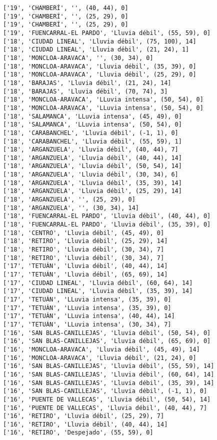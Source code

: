 \documentclass[11pt]{article}
\begin{document}
\begin{Verbatim}[commandchars=\\\{\}]
['19', 'CHAMBERÍ', '', (40, 44), 0]
['19', 'CHAMBERÍ', '', (25, 29), 0]
['19', 'CHAMBERÍ', '', (25, 29), 0]
['19', 'FUENCARRAL-EL PARDO', 'Lluvia débil', (55, 59), 0]
['18', 'CIUDAD LINEAL', 'Lluvia débil', (75, 100), 14]
['18', 'CIUDAD LINEAL', 'Lluvia débil', (21, 24), 1]
['18', 'MONCLOA-ARAVACA', '', (30, 34), 0]
['18', 'MONCLOA-ARAVACA', 'Lluvia débil', (35, 39), 0]
['18', 'MONCLOA-ARAVACA', 'Lluvia débil', (25, 29), 0]
['18', 'BARAJAS', 'Lluvia débil', (21, 24), 14]
['18', 'BARAJAS', 'Lluvia débil', (70, 74), 3]
['18', 'MONCLOA-ARAVACA', 'LLuvia intensa', (50, 54), 0]
['18', 'MONCLOA-ARAVACA', 'LLuvia intensa', (50, 54), 0]
['18', 'SALAMANCA', 'LLuvia intensa', (45, 49), 0]
['18', 'SALAMANCA', 'LLuvia intensa', (50, 54), 0]
['18', 'CARABANCHEL', 'Lluvia débil', (-1, 1), 0]
['18', 'CARABANCHEL', 'Lluvia débil', (55, 59), 1]
['18', 'ARGANZUELA', 'Lluvia débil', (40, 44), 7]
['18', 'ARGANZUELA', 'Lluvia débil', (40, 44), 14]
['18', 'ARGANZUELA', 'Lluvia débil', (50, 54), 14]
['18', 'ARGANZUELA', 'Lluvia débil', (30, 34), 6]
['18', 'ARGANZUELA', 'Lluvia débil', (35, 39), 14]
['18', 'ARGANZUELA', 'Lluvia débil', (25, 29), 14]
['18', 'ARGANZUELA', '', (25, 29), 0]
['18', 'ARGANZUELA', '', (30, 34), 14]
['18', 'FUENCARRAL-EL PARDO', 'Lluvia débil', (40, 44), 0]
['18', 'FUENCARRAL-EL PARDO', 'Lluvia débil', (35, 39), 0]
['18', 'CENTRO', 'Lluvia débil', (45, 49), 0]
['18', 'RETIRO', 'Lluvia débil', (25, 29), 14]
['18', 'RETIRO', 'Lluvia débil', (30, 34), 7]
['18', 'RETIRO', 'Lluvia débil', (30, 34), 7]
['17', 'TETUÁN', 'Lluvia débil', (40, 44), 14]
['17', 'TETUÁN', 'Lluvia débil', (65, 69), 14]
['17', 'CIUDAD LINEAL', 'Lluvia débil', (60, 64), 14]
['17', 'CIUDAD LINEAL', 'Lluvia débil', (35, 39), 14]
['17', 'TETUÁN', 'LLuvia intensa', (35, 39), 0]
['17', 'TETUÁN', 'LLuvia intensa', (35, 39), 0]
['17', 'TETUÁN', 'LLuvia intensa', (40, 44), 14]
['17', 'TETUÁN', 'LLuvia intensa', (30, 34), 7]
['16', 'SAN BLAS-CANILLEJAS', 'Lluvia débil', (50, 54), 0]
['16', 'SAN BLAS-CANILLEJAS', 'Lluvia débil', (65, 69), 0]
['16', 'MONCLOA-ARAVACA', 'Lluvia débil', (45, 49), 14]
['16', 'MONCLOA-ARAVACA', 'Lluvia débil', (21, 24), 0]
['16', 'SAN BLAS-CANILLEJAS', 'Lluvia débil', (55, 59), 14]
['16', 'SAN BLAS-CANILLEJAS', 'Lluvia débil', (60, 64), 14]
['16', 'SAN BLAS-CANILLEJAS', 'Lluvia débil', (35, 39), 14]
['16', 'SAN BLAS-CANILLEJAS', 'Lluvia débil', (-1, 1), 0]
['16', 'PUENTE DE VALLECAS', 'Lluvia débil', (50, 54), 14]
['16', 'PUENTE DE VALLECAS', 'Lluvia débil', (40, 44), 7]
['16', 'RETIRO', 'Lluvia débil', (25, 29), 7]
['16', 'RETIRO', 'Lluvia débil', (40, 44), 14]
['16', 'RETIRO', 'Despejado', (55, 59), 0]

\end{Verbatim}
\end{document}
